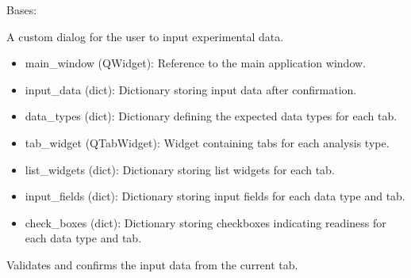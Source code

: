 \documentclass[a4paper,10pt,english]{sphinxmanual}
\begin{document}
\begin{fulllineitems}
\label{\detokenize{utils:src.utils.input_help.DataInputDialog}}
\pysigstartsignatures
{}
\pysigstopsignatures
\sphinxAtStartPar
Bases: 

\sphinxAtStartPar
A custom dialog for the user to input experimental data.
\begin{description}
\begin{itemize}
\item {} 
\sphinxAtStartPar
main\_window (QWidget): Reference to the main application window.

\item {} 
\sphinxAtStartPar
input\_data (dict): Dictionary storing input data after confirmation.

\item {} 
\sphinxAtStartPar
data\_types (dict): Dictionary defining the expected data types for each tab.

\item {} 
\sphinxAtStartPar
tab\_widget (QTabWidget): Widget containing tabs for each analysis type.

\item {} 
\sphinxAtStartPar
list\_widgets (dict): Dictionary storing list widgets for each tab.

\item {} 
\sphinxAtStartPar
input\_fields (dict): Dictionary storing input fields for each data type and tab.

\item {} 
\sphinxAtStartPar
check\_boxes (dict): Dictionary storing checkboxes indicating readiness for each data type and tab.

\end{itemize}

\end{description}

\begin{fulllineitems}
\label{\detokenize{utils:src.utils.input_help.DataInputDialog.confirm_input}}
\pysigstartsignatures
{}
\pysigstopsignatures
\sphinxAtStartPar
Validates and confirms the input data from the current tab.


\end{fulllineitems}
\end{fulllineitems}
\end{document}
